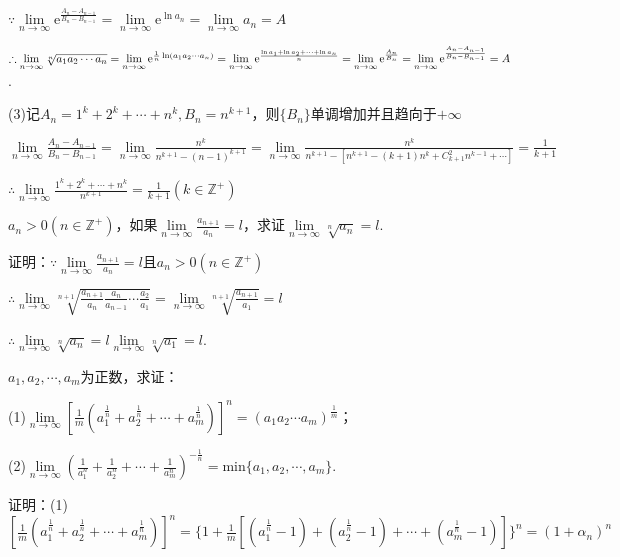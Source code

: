 \documentclass[12pt,UTF8]{ctexart}
\begin{document}
\begin{enumerate}
$\because\lim\limits_{n\rightarrow\infty}\mathrm e^{\frac{A_n-A_{n-1}}{B_n-B_{n-1}}}=\lim\limits_{n\rightarrow\infty}\mathrm e^{\ln a_n}=\lim\limits_{n\rightarrow\infty}a_n=A$


$\therefore\lim\limits_{n\rightarrow\infty}\sqrt[n]{a_1a_2\cdots a_n}=\lim\limits_{n\rightarrow\infty}\mathrm e^{\frac1n\ln(a_1a_2\cdots a_n)}=\lim\limits_{n\rightarrow\infty}\mathrm e^{\frac{\ln a_1+\ln a_2+\cdots+\ln a_n}{n}}=\lim\limits_{n\rightarrow\infty}\mathrm e^{\frac{A_n}{B_n}}=\lim\limits_{n\rightarrow\infty}\mathrm e^{\frac{A_n-A_{n-1}}{B_n-B_{n-1}}}\\
=A$.

(3)记$A_n=1^k+2^k+\cdots+n^k,B_n=n^{k+1}$，则$\{B_n\}$单调增加并且趋向于$+\infty$

$\lim\limits_{n\rightarrow\infty}\frac{A_n-A_{n-1}}{B_n-B_{n-1}}=\lim\limits_{n\rightarrow\infty}\frac{n^k}{n^{k+1}-(n-1)^{k+1}}=\lim\limits_{n\rightarrow\infty}\frac{n^k}{n^{k+1}-[n^{k+1}-(k+1)n^k+C_{k+1}^2n^{k-1}+\cdots]}=\frac1{k+1}$

$\therefore\lim\limits_{n\rightarrow\infty}\frac{1^k+2^k+\cdots+n^k}{n^{k+1}}=\frac1{k+1}(k\in\mathbb Z^+)$

$a_n>0(n\in\mathbb Z^+)$，如果$\lim\limits_{n\rightarrow\infty}\frac{a_{n+1}}{a_n}=l$，求证$\lim\limits_{n\rightarrow\infty}\sqrt[n]{a_n}=l$.

证明：$\because\lim\limits_{n\rightarrow\infty}\frac{a_{n+1}}{a_n}=l$且$a_n>0(n\in\mathbb Z^+)$

$\therefore\lim\limits_{n\rightarrow\infty}\sqrt[n+1]{\frac{a_{n+1}}{a_{n}}\frac{a_{n}}{a_{n-1}}\cdots\frac{a_2}{a_1}}=\lim\limits_{n\rightarrow\infty}\sqrt[n+1]{\frac{a_{n+1}}{a_{1}}}=l$

$\therefore\lim\limits_{n\rightarrow\infty}\sqrt[n]{a_n}=l\lim\limits_{n\rightarrow\infty}\sqrt[n]{a_1}=l$.

$a_1,a_2,\cdots,a_m$为正数，求证：

(1)$\lim\limits_{n\rightarrow\infty}[\frac1m(a_1^{\frac1n}+a_2^{\frac1n}+\cdots+a_m^{\frac1n})]^n=(a_1a_2\cdots a_m)^{\frac1m}$；

(2)$\lim\limits_{n\rightarrow\infty}(\frac1{a_1^n}+\frac1{a_2^n}+\cdots+\frac1{a_m^n})^{-\frac1n}=\text{min}\{a_1,a_2,\cdots,a_m\}$.

证明：(1)$[\frac1m(a_1^{\frac1n}+a_2^{\frac1n}+\cdots+a_m^{\frac1n})]^n=\{1+\frac1m[(a_1^{\frac1n}-1)+(a_2^{\frac1n}-1)+\cdots+(a_m^{\frac1n}-1)]\}^n=(1+\alpha_n)^n$


\end{enumerate}
\end{document}
